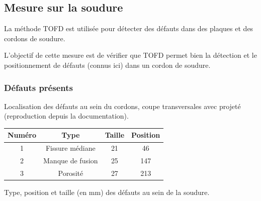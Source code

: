 \subsection{Mesure sur la soudure}

La méthode TOFD est utilisée pour détecter des défauts dans des plaques et des cordons de soudure.

L'objectif de cette mesure est de vérifier que TOFD permet bien la détection et le positionnement de défauts (connus ici) dans un cordon de soudure.

\subsubsection{Défauts présents}

\begin{figurehere}
    \centering
    \caption{Localisation des défauts au sein du cordons, coupe transversales avec projeté (reproduction depuis la documentation).}
    \label{tofd:fig:defects}
\end{figurehere}

\begin{tablehere}
\centering
\begin{tabular}{c|c|c|c}
Numéro & Type & Taille & Position \\ \hline
1 & Fissure médiane & 21 & 46 \\
2 & Manque de fusion & 25 & 147 \\
3 & Porosité & 27 & 213
\end{tabular}
\caption{\label{tofd:tab:defects} Type, position et taille (en mm) des défauts au sein de la soudure.}
\end{tablehere}

